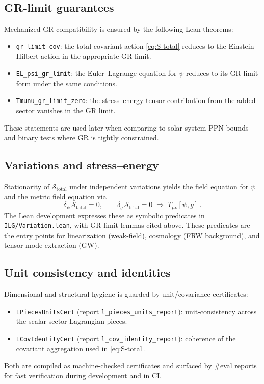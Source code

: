 \documentclass[aps,prd,twocolumn,superscriptaddress,nofootinbib,floatfix,longbibliography]{revtex4-2}
\newcommand{\Action}{\mathcal{S}}
\newcommand{\lean}[1]{\texttt{#1}}
\begin{document}
\subsection{GR-limit guarantees}
Mechanized GR-compatibility is ensured by the following Lean theorems:
\begin{itemize}
  \item \lean{gr_limit_cov}: the total covariant action \eqref{eq:S-total} reduces to the Einstein--Hilbert action in the appropriate GR limit.
  \item \lean{EL_psi_gr_limit}: the Euler--Lagrange equation for $\psi$ reduces to its GR-limit form under the same conditions.
  \item \lean{Tmunu_gr_limit_zero}: the stress--energy tensor contribution from the added sector vanishes in the GR limit.
\end{itemize}
These statements are used later when comparing to solar-system PPN bounds and binary tests where GR is tightly constrained.

\subsection{Variations and stress--energy}
Stationarity of $\Action_{\mathrm{total}}$ under independent variations yields the field equation for $\psi$ and the metric field equation via
\begin{equation}
  \delta_\psi\,\Action_{\mathrm{total}} = 0,\qquad
  \delta_g\,\Action_{\mathrm{total}} = 0\;\Rightarrow\; T_{\mu\nu}[\psi,g]\,.
\end{equation}
The Lean development expresses these as symbolic predicates in \texttt{ILG/Variation.lean}, with GR-limit lemmas cited above. These predicates are the entry points for linearization (weak-field), cosmology (FRW background), and tensor-mode extraction (GW).

\subsection{Unit consistency and identities}
Dimensional and structural hygiene is guarded by unit/covariance certificates:
\begin{itemize}
  \item \lean{LPiecesUnitsCert} (report \lean{l_pieces_units_report}): unit-consistency across the scalar-sector Lagrangian pieces.
  \item \lean{LCovIdentityCert} (report \lean{l_cov_identity_report}): coherence of the covariant aggregation used in \eqref{eq:S-total}.
\end{itemize}
Both are compiled as machine-checked certificates and surfaced by \#eval reports for fast verification during development and in CI.
\end{document}
